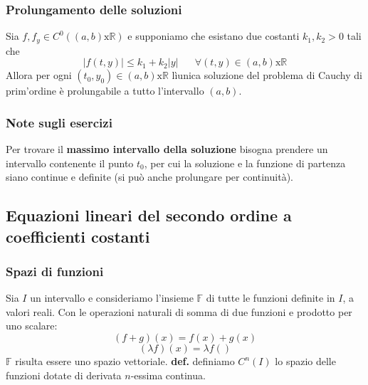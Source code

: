 \subsubsection{Prolungamento delle soluzioni}
Sia $f, f_y \in C^0\left( (a,b) \text{x} \mathbb{R} \right)$ e supponiamo che esistano due costanti $k_1,k_2 > 0$ tali che 
\[
    |f(t,y)| \leq k_1 + k_2 |y| \;\;\;\;\; \;\forall(t,y) \in(a,b)\text{x}\mathbb{R}
\]
Allora per ogni $(t_0,y_0) \in(a,b) \text{x} \mathbb{R}$ lìunica soluzione del problema di Cauchy di prim'ordine è prolungabile a tutto l'intervallo $(a,b)$.
\subsubsection{Note sugli esercizi}
Per trovare il \textbf{massimo intervallo della soluzione} bisogna prendere un intervallo contenente il punto $t_0$, per cui la soluzione e la funzione di partenza siano continue e definite (si può anche prolungare per continuità).
\subsection{Equazioni lineari del secondo ordine a coefficienti costanti}
\subsubsection{Spazi di funzioni}
Sia $I$ un intervallo e consideriamo l'insieme $\mathbb{F}$ di tutte le funzioni definite in $I$, a valori reali. Con le operazioni naturali di somma di due funzioni e prodotto per uno scalare:
\[
    (f+g)(x) = f(x) + g(x)
\]
\[
    (\lambda f)(x) = \lambda f()
\]
$\mathbb{F}$ risulta essere uno spazio vettoriale. \newline
\newline
\textbf{def.} definiamo $C^n(I)$ lo spazio delle funzioni dotate di derivata $n$-essima continua.
